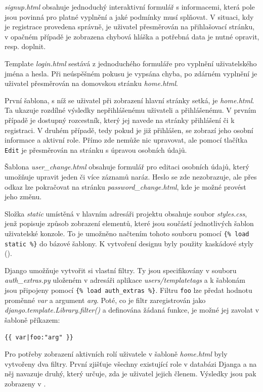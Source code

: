 \textit{signup.html} obsahuje jednoduchý interaktivní formulář s informacemi, která pole jsou povinná pro platné vyplnění a jaké podmínky musí splňovat. V situaci, kdy je registrace provedena správně, je uživatel přesměrován na přihlašovací stránku, v opačném případě je zobrazena chybová hláška a potřebná data je nutné opravit, resp. doplnit.

Template \textit{login.html} sestává z jednoduchého formuláře pro vyplnění uživatelského jména a hesla. Při neúspěšném pokusu je vypsána chyba, po zdárném vyplnění je uživatel přesměrován na domovskou stránku \textit{home.html}.

První šablona, s níž se uživatel při zobrazení hlavní stránky setká, je \textit{home.html}. Ta ukazuje rozdílné výsledky nepřihlášenému uživateli a přihlášenému. V prvním případě je dostupný rozcestník, který jej navede na stránky přihlášení či k registraci. V druhém případě, tedy pokud je již přihlášen, se zobrazí jeho osobní informace a aktivní role. Přímo zde nemůže nic upravovat, ale pomocí tlačítka \texttt{Edit} je přesměrován na stránku s úpravou osobních údajů.

Šablona \textit{user\_change.html} obsahuje formulář pro editaci osobních údajů, který umožňuje upravit jeden či více záznamů naráz. Heslo se zde nezobrazuje, ale přes odkaz lze pokračovat na stránku \textit{password\_change.html}, kde je možné provést jeho změnu.

Složka \textit{static} umístěná v hlavním adresáři projektu obsahuje soubor \textit{styles.css}, jenž popisuje způsob zobrazení elementů, které jsou součástí jednotlivých šablon uživatelské konzole. To je umožněno načtením tohoto souboru pomocí \texttt{\{\% load static \%\}} do bázové šablony. K vytvoření designu byly použity kaskádové styly ().

Django umožňuje vytvořit si vlastní filtry. Ty jsou specifikovány v souboru \textit{auth\_extras.py} uloženém v adresáři aplikace \textit{users/templatetags} a k šablonám jsou připojeny pomocí \texttt{\{\% load auth\_extras \%\}}. Filtru \texttt{foo} lze předat hodnotu proměnné \textit{var} a argument \textit{arg}. Poté, co je filtr zaregistrován jako \textit{django.template.Library.filter()} a definována žádaná funkce, je možné jej zavolat v šabloně příkazem:

\texttt{\{\{ var|foo:"arg" \}\}}

Pro potřeby zobrazení aktivních rolí uživatele v šabloně \textit{home.html} byly vytvořeny dva filtry. První zjišťuje všechny existující role v databázi Djanga a na něj navazuje druhý, který určuje, zda je uživatel jejich členem. Výsledky jsou pak zobrazeny v .

